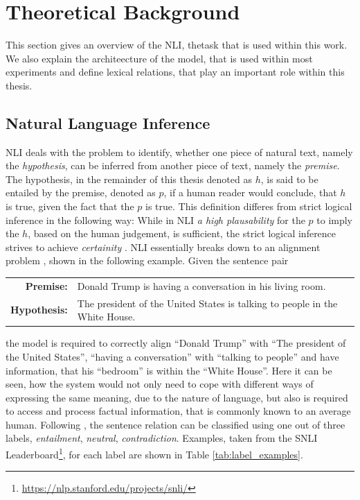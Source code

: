 \section{Theoretical Background}\label{sec:basics}
This section gives an overview of the \ac{NLI}, thetask that is used within this work. We also explain the architeecture of the model, that is used within most experiments and define lexical relations, that play an important role within this thesis.
\subsection{Natural Language Inference}\label{sec:basics_nli}
\ac{NLI} \citep{bowman2015large} deals with the problem to identify, whether one piece of natural text, namely the \textit{hypothesis}, can be inferred from another piece of text, namely the \textit{premise}. The hypothesis, in the remainder of this thesis denoted as $h$, is said to be entailed by the premise, denoted as $p$, if a human reader would conclude, that $h$ is true, given the fact that the $p$ is true. This definition differes from strict logical inference in the following way: While in \ac{NLI} \textit{a high plausability} for the $p$ to imply the $h$, based on the human judgement, is sufficient, the strict logical inference strives to achieve \textit{certainity} \citep{dagan2009recognizing}. \ac{NLI} essentially breaks down to an alignment problem \citep{maccartney2008phrase}, shown in the following example. Given the sentence pair
\begin{center}
\begin{tabular}{rl}
\textbf{Premise:} & Donald Trump is having a conversation in his living room. \\
\textbf{Hypothesis:} & The president of the United States is talking to people in the White House. 
\end{tabular}
\end{center}
the model is required to correctly align ``Donald Trump'' with ``The president of the United States'', ``having a conversation'' with ``talking to people'' and have information, that his ``bedroom'' is within the ``White House''. Here it can be seen, how the system would not only need to cope with different ways of expressing the same meaning, due to the nature of language, but also is required to access and process factual information, that is commonly known to an average human. Following \cite{bowman2015large}, the sentence relation can be classified using one out of three labels, \textit{entailment}, \textit{neutral}, \textit{contradiction}. Examples, taken from the SNLI Leaderboard\footnote{\href{https://nlp.stanford.edu/projects/snli/}{https://nlp.stanford.edu/projects/snli/}}, for each label are shown in Table \ref{tab:label_examples}.
